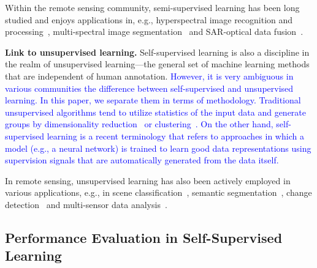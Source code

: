 \documentclass[lettersize,journal]{IEEEtran}
\begin{document}
Within the remote sensing community, semi-supervised learning has been long studied and enjoys applications in, e.g., hyperspectral image recognition and processing~\cite{dopido2013semisupervised,ratle2010semisupervised,wang2018self,hong2019wu,hong2019learning,hong2020joint,cao2020sdfl,cao20203d,li2020deep,yue2021self}, multi-spectral image segmentation~\cite{hong2019cospace,hong2019learnable,hong2020x,hu2020unsupervised,hua2021semantic,hua2021aerial,saha2020semisupervised} and SAR-optical data fusion~\cite{hu2019mima}.



\textbf{Link to unsupervised learning.} Self-supervised learning is also a discipline in the realm of unsupervised learning---the general set of machine learning methods that are independent of human annotation. \textcolor{blue}{However, it is very ambiguous in various communities the difference between self-supervised and unsupervised learning. In this paper, we separate them in terms of methodology. Traditional unsupervised algorithms tend to utilize statistics of the input data and generate groups by dimensionality reduction~\cite{abdi2010principal,cheriyadat2013unsupervised} or clustering~\cite{jain1999data}. On the other hand, self-supervised learning is a recent terminology that refers to approaches in which a model (e.g., a neural network) is trained to learn good data representations using supervision signals that are automatically generated from the data itself.}

In remote sensing, unsupervised learning has also been actively employed in various applications, e.g., in scene classification~\cite{li2016unsupervisedrs,cheriyadat2013unsupervised,romero2015unsupervised}, semantic segmentation~\cite{bandyopadhyay2007multiobjective,fan2009single,saha2020unsupervised}, change detection~\cite{ghosh2011fuzzy,munyati2004use} and multi-sensor data analysis~\cite{zabalza2014novel,cao2003remote}. 





\subsection{Performance Evaluation in Self-Supervised Learning}
\end{document}
